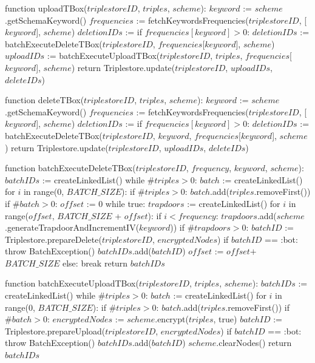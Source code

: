function uploadTBox($triplestoreID$, $triples$, $scheme$):
    $keyword$ := $scheme$.getSchemaKeyword()
    $frequencies$ := fetchKeywordsFrequencies($triplestoreID$, [$keyword$], $scheme$)
    $deletionIDs$ := {}
    if $frequencies[keyword] > 0$:
        $deletionIDs$ := batchExecuteDeleteTBox($triplestoreID$, $frequencies$[$keyword$], $scheme$)
    $uploadIDs$ := batchExecuteUploadTBox($triplestoreID$, $triples$, $frequencies$[$keyword$], $scheme$)
    return Triplestore.update($triplestoreID$, $uploadIDs$, $deleteIDs$)

function deleteTBox($triplestoreID$, $triples$, $scheme$):
    $keyword$ := $scheme$.getSchemaKeyword()
    $frequencies$ := fetchKeywordsFrequencies($triplestoreID$, [$keyword$], $scheme$)
    $deletionIDs$ := {}
    if $frequencies[keyword] > 0$:
        $deletionIDs$ := batchExecuteDeleteTBox($triplestoreID$, $keyword$, $frequencies$[$keyword$], $scheme$)
    return Triplestore.update($triplestoreID$, $uploadIDs$, $deleteIDs$)

function batchExecuteDeleteTBox($triplestoreID$, $frequency$, $keyword$, $scheme$):
    $batchIDs$ := createLinkedList()
    while $\#triples > 0$: 
        $batch$ := createLinkedList()
        for $i$ in range(0, $BATCH\_SIZE$):
            if $\#triples > 0$:
                $batch$.add($triples$.removeFirst())
        if $\#batch > 0$:
            $offset$ := 0
            while true:
                $trapdoors$ := createLinkedList()       
                for $i$ in range($offset$, $BATCH\_SIZE$ + $offset$):
                    if $i < frequency$:
                        $trapdoors$.add($scheme$.generateTrapdoorAndIncrementIV($keyword$))
                if $\#trapdoors > 0$:
                    $batchID$ := Triplestore.prepareDelete($triplestoreID$, $encryptedNodes$)
                    if $batchID$ == :bot:
                        throw BatchException()
                    $batchIDs$.add($batchID$)
                    $offset$ := $offset$$ + $$BATCH\_SIZE$
                else:
                    break
    return $batchIDs$

function batchExecuteUploadTBox($triplestoreID$, $triples$, $scheme$):
    $batchIDs$ := createLinkedList()
    while $\#triples > 0$: 
        $batch$ := createLinkedList()
        for $i$ in range(0, $BATCH\_SIZE$):
            if $\#triples > 0$:
                $batch$.add($triples$.removeFirst())
        if $\#batch > 0$:
            $encryptedNodes$ := $scheme$.encrypt($triples$, true)
            $batchID$ := Triplestore.prepareUpload($triplestoreID$, $encryptedNodes$)
            if $batchID$ == :bot:
                throw BatchException()
            $batchIDs$.add($batchID$)
        $scheme$.clearNodes()
    return $batchIDs$